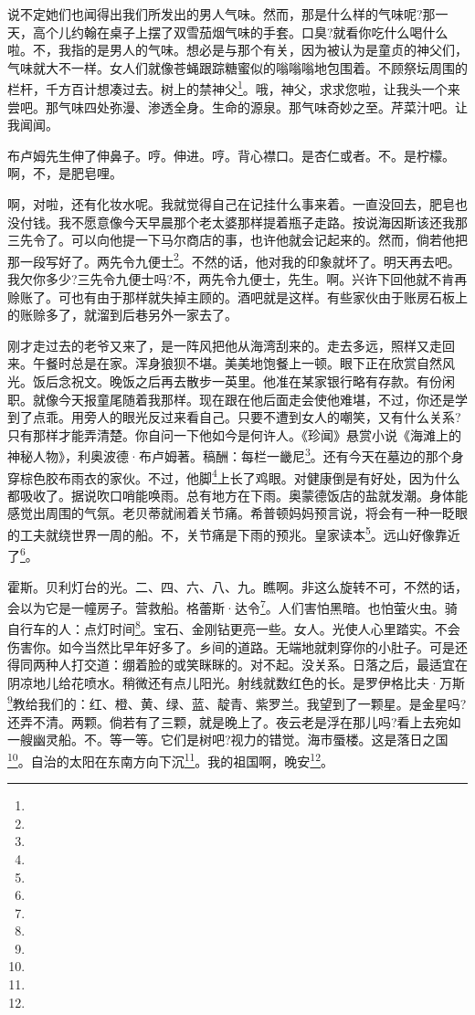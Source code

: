 \par 说不定她们也闻得出我们所发出的男人气味。然而，那是什么样的气味呢?那一天，高个儿约翰在桌子上摆了双雪茄烟气味的手套。口臭?就看你吃什么喝什么啦。不，我指的是男人的气味。想必是与那个有关，因为被认为是童贞的神父们，气味就大不一样。女人们就像苍蝇跟踪糖蜜似的嗡嗡嗡地包围着。不顾祭坛周围的栏杆，千方百计想凑过去。树上的禁神父\footnote{}。哦，神父，求求您啦，让我头一个来尝吧。那气味四处弥漫、渗透全身。生命的源泉。那气味奇妙之至。芹菜汁吧。让我闻闻。
\par 布卢姆先生伸了伸鼻子。哼。伸进。哼。背心襟口。是杏仁或者。不。是柠檬。啊，不，是肥皂哩。
\par 啊，对啦，还有化妆水呢。我就觉得自己在记挂什么事来着。一直没回去，肥皂也没付钱。我不愿意像今天早晨那个老太婆那样提着瓶子走路。按说海因斯该还我那三先令了。可以向他提一下马尔商店的事，也许他就会记起来的。然而，倘若他把那一段写好了。两先令九便士\footnote{}。不然的话，他对我的印象就坏了。明天再去吧。我欠你多少?三先令九便士吗?不，两先令九便士，先生。啊。兴许下回他就不肯再赊账了。可也有由于那样就失掉主顾的。酒吧就是这样。有些家伙由于账房石板上的账赊多了，就溜到后巷另外一家去了。
\par 刚才走过去的老爷又来了，是一阵风把他从海湾刮来的。走去多远，照样又走回来。午餐时总是在家。浑身狼狈不堪。美美地饱餐上一顿。眼下正在欣赏自然风光。饭后念祝文。晚饭之后再去散步一英里。他准在某家银行略有存款。有份闲职。就像今天报童尾随着我那样。现在跟在他后面走会使他难堪，不过，你还是学到了点乖。用旁人的眼光反过来看自己。只要不遭到女人的嘲笑，又有什么关系?只有那样才能弄清楚。你自问一下他如今是何许人。《珍闻》悬赏小说《海滩上的神秘人物》，利奥波德·布卢姆著。稿酬：每栏一畿尼\footnote{}。还有今天在墓边的那个身穿棕色胶布雨衣的家伙。不过，他脚\footnote{}上长了鸡眼。对健康倒是有好处，因为什么都吸收了。据说吹口哨能唤雨。总有地方在下雨。奥蒙德饭店的盐就发潮。身体能感觉出周围的气氛。老贝蒂就闹着关节痛。希普顿妈妈预言说，将会有一种一眨眼的工夫就绕世界一周的船。不，关节痛是下雨的预兆。皇家读本\footnote{}。远山好像靠近了\footnote{}。
\par 霍斯。贝利灯台的光。二、四、六、八、九。瞧啊。非这么旋转不可，不然的话，会以为它是一幢房子。营救船。格蕾斯·达令\footnote{}。人们害怕黑暗。也怕萤火虫。骑自行车的人：点灯时间\footnote{}。宝石、金刚钻更亮一些。女人。光使人心里踏实。不会伤害你。如今当然比早年好多了。乡间的道路。无端地就刺穿你的小肚子。可是还得同两种人打交道：绷着脸的或笑眯眯的。对不起。没关系。日落之后，最适宜在阴凉地儿给花喷水。稍微还有点儿阳光。射线就数红色的长。是罗伊格比夫·万斯\footnote{}教给我们的：红、橙、黄、绿、蓝、靛青、紫罗兰。我望到了一颗星。是金星吗?还弄不清。两颗。倘若有了三颗，就是晚上了。夜云老是浮在那儿吗?看上去宛如一艘幽灵船。不。等一等。它们是树吧?视力的错觉。海市蜃楼。这是落日之国\footnote{}。自治的太阳在东南方向下沉\footnote{}。我的祖国啊，晚安\footnote{}。
